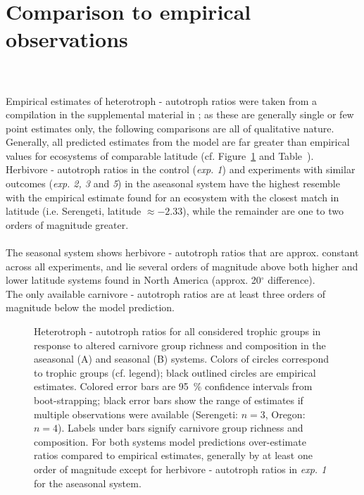 \section{Comparison to empirical observations}
\\\\
Empirical estimates of heterotroph - autotroph ratios were taken from a compilation in the supplemental material in \cite{Harfoot2014}; as these are generally single or few point estimates only, the following comparisons are all of qualitative nature. Generally, all predicted estimates from the model are far greater than empirical values for ecosystems of comparable latitude (cf. Figure~\ref{fig:chap:res:dyn:ratios} and Table~). \\Herbivore - autotroph ratios in the control (\textit{exp. 1}) and experiments with similar outcomes (\textit{exp. 2, 3} and \textit{5}) in the aseasonal system have the highest resemble with the empirical estimate found for an ecosystem with the closest match in latitude (i.e. Serengeti, latitude $  \approx -2.33$), while the remainder are one to two orders of magnitude greater. \\\\
The seasonal system shows herbivore - autotroph ratios that are approx. constant across all experiments, and lie several orders of magnitude above both higher and lower latitude  systems found in North America (approx. 20$^\circ$ difference). \\ 
The only available carnivore - autotroph ratios are at least three orders of magnitude below the model prediction.
\begin{figure}
\centering

\caption[Comparison to empirical data]{Heterotroph - autotroph ratios for all considered trophic groups in response to altered carnivore group richness and composition in the aseasonal (A) and seasonal (B) systems. Colors of circles correspond to trophic groups (cf. legend); black outlined circles are empirical estimates. Colored error bars are 95~\% confidence intervals from boot-strapping; black error bars show the range of estimates if multiple observations were available (Serengeti: $n = 3$, Oregon: $n = 4$). Labels under bars signify carnivore group richness and composition. For both systems model predictions over-estimate ratios compared to empirical estimates, generally  by at least one order of magnitude except for herbivore - autotroph ratios in \textit{exp. 1} for the aseasonal system.}
\label{fig:chap:res:dyn:ratios}
\end{figure}



%